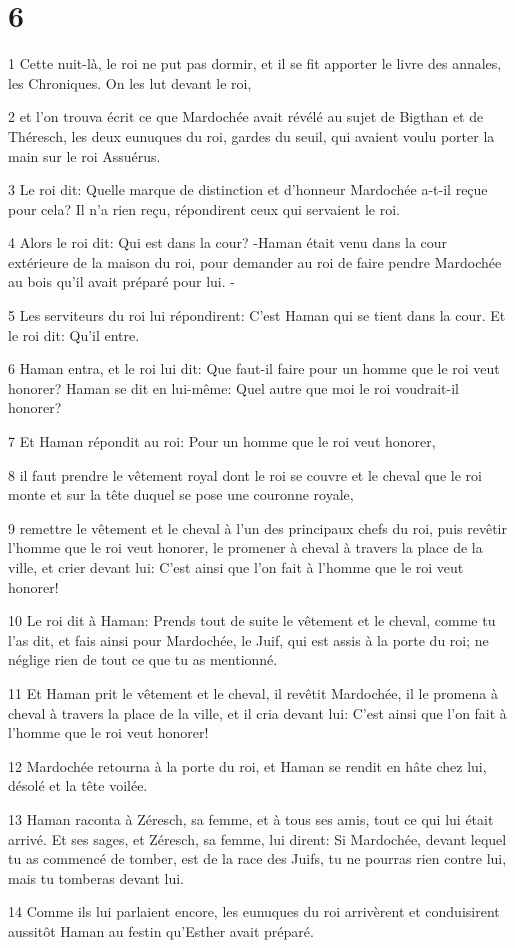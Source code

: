 \chapter{6}

\par 1 Cette nuit-là, le roi ne put pas dormir, et il se fit apporter le livre des annales, les Chroniques. On les lut devant le roi,
\par 2 et l'on trouva écrit ce que Mardochée avait révélé au sujet de Bigthan et de Théresch, les deux eunuques du roi, gardes du seuil, qui avaient voulu porter la main sur le roi Assuérus.
\par 3 Le roi dit: Quelle marque de distinction et d'honneur Mardochée a-t-il reçue pour cela? Il n'a rien reçu, répondirent ceux qui servaient le roi.
\par 4 Alors le roi dit: Qui est dans la cour? -Haman était venu dans la cour extérieure de la maison du roi, pour demander au roi de faire pendre Mardochée au bois qu'il avait préparé pour lui. -
\par 5 Les serviteurs du roi lui répondirent: C'est Haman qui se tient dans la cour. Et le roi dit: Qu'il entre.
\par 6 Haman entra, et le roi lui dit: Que faut-il faire pour un homme que le roi veut honorer? Haman se dit en lui-même: Quel autre que moi le roi voudrait-il honorer?
\par 7 Et Haman répondit au roi: Pour un homme que le roi veut honorer,
\par 8 il faut prendre le vêtement royal dont le roi se couvre et le cheval que le roi monte et sur la tête duquel se pose une couronne royale,
\par 9 remettre le vêtement et le cheval à l'un des principaux chefs du roi, puis revêtir l'homme que le roi veut honorer, le promener à cheval à travers la place de la ville, et crier devant lui: C'est ainsi que l'on fait à l'homme que le roi veut honorer!
\par 10 Le roi dit à Haman: Prends tout de suite le vêtement et le cheval, comme tu l'as dit, et fais ainsi pour Mardochée, le Juif, qui est assis à la porte du roi; ne néglige rien de tout ce que tu as mentionné.
\par 11 Et Haman prit le vêtement et le cheval, il revêtit Mardochée, il le promena à cheval à travers la place de la ville, et il cria devant lui: C'est ainsi que l'on fait à l'homme que le roi veut honorer!
\par 12 Mardochée retourna à la porte du roi, et Haman se rendit en hâte chez lui, désolé et la tête voilée.
\par 13 Haman raconta à Zéresch, sa femme, et à tous ses amis, tout ce qui lui était arrivé. Et ses sages, et Zéresch, sa femme, lui dirent: Si Mardochée, devant lequel tu as commencé de tomber, est de la race des Juifs, tu ne pourras rien contre lui, mais tu tomberas devant lui.
\par 14 Comme ils lui parlaient encore, les eunuques du roi arrivèrent et conduisirent aussitôt Haman au festin qu'Esther avait préparé.

